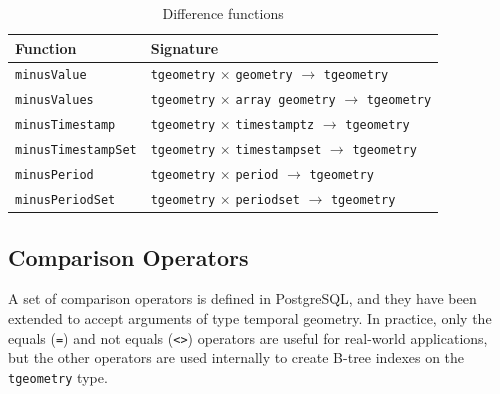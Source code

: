 \begin{table}[h!]
    \centering
    \begin{tabularx}{\textwidth}{|l|X|}
    \hline
    \textbf{Function}   & \textbf{Signature} \\ 
    \hline
    \lstinline+minusValue+             & \lstinline+tgeometry+ $\times$ \lstinline+geometry+ $\rightarrow$ \lstinline+tgeometry+\\
    \hline
    \lstinline+minusValues+            & \lstinline+tgeometry+ $\times$ \lstinline+array geometry+ $\rightarrow$ \lstinline+tgeometry+\\
    \hline
    \lstinline+minusTimestamp+         & \lstinline+tgeometry+ $\times$ \lstinline+timestamptz+ $\rightarrow$ \lstinline+tgeometry+ \\
    \hline
    \lstinline+minusTimestampSet+      & \lstinline+tgeometry+ $\times$ \lstinline+timestampset+ $\rightarrow$ \lstinline+tgeometry+ \\
    \hline
    \lstinline+minusPeriod+            & \lstinline+tgeometry+ $\times$ \lstinline+period+ $\rightarrow$ \lstinline+tgeometry+ \\
    \hline
    \lstinline+minusPeriodSet+         & \lstinline+tgeometry+ $\times$ \lstinline+periodset+ $\rightarrow$ \lstinline+tgeometry+ \\
    \hline
    \end{tabularx}
    \caption{Difference functions}
    \label{table:diff_funcs}
\end{table}

\subsection{Comparison Operators}
\label{section:comparison_funcs}

A set of comparison operators is defined in PostgreSQL, and they have been extended to accept arguments of type temporal geometry. In practice, only the equals (\lstinline+=+) and not equals (\lstinline+<>+) operators are useful for real-world applications, but the other operators are used internally to create B-tree indexes on the \lstinline+tgeometry+ type.

